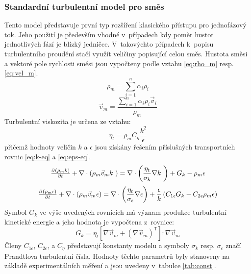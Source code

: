 \subsubsection{Standardní \kepsb{} turbulentní model pro směs}
Tento model představuje první typ rozšíření klasického \keps{} přístupu pro jednofázový tok. Jeho použití je především vhodné v~případech kdy poměr hustot jednotlivých fází je blízký jedničce. V~takovýchto případech k~popisu turbulentního proudění stačí využít veličiny popisující celou směs. Hustota směsi a vektoré pole rychlosti směsi jsou vypočteny podle vztahu \ref{eq:rho_m} resp. \ref{eq:vel_m}.
\begin{equation}
	\rho_{m} = \sum_{i=1}^n \alpha_{i}\rho_{i}
	\label{eq:rho_m}
\end{equation}  
\begin{equation}
	\vec{v}_{m} = \frac{\sum_{i=1}^n \alpha_{i}\rho_{i}\vec{v}_{i}}{\rho_{m} }
	\label{eq:vel_m}
\end{equation}  
Turbulentní viskozita je určena ze vztahu:
\begin{equation}
	\eta_{t} = \rho_{m}C_{\eta}\frac{k^{2}}{\epsilon}
	\label{eq:turb}
\end{equation}  
přičemž hodnoty veličin $k$ a $\epsilon$ jsou získány řešením příslušných transportních rovnic \ref{eq:k-eq} a \ref{eq:eps-eq}.
\begin{equation}
	\pd{\kula{\rho_{m}k}}{t} +  \nabla  \cdot \left( \rho_{m} \vec{v}_{m} k~\right) = \nabla  \cdot \left( \frac{\eta_{t}}{\sigma_{k}} \nabla k~\right) + G_{k} - \rho_{m}\epsilon
	\label{eq:k-eq}
\end{equation}  
\begin{equation}
	\pd{\kula{\rho_{m}\epsilon}}{t} +  \nabla  \cdot \left( \rho_{m} \vec{v}_{m} \epsilon \right) = \nabla  \cdot \left( \frac{\eta_{t}}{\sigma_{\epsilon}} \nabla \epsilon \right) + \frac{\epsilon}{k} \left( C_{1\epsilon}G_{k} - C_{2\epsilon}\rho_{m}\epsilon \right)
	\label{eq:eps-eq}
\end{equation}  
Symbol $G_{k}$ ve výše uvedených rovnicích má význam produkce turbulentní kinetické energie a jeho hodnota je vypočtena z~rovnice:
\begin{equation}
   G_{k} = \eta_{t} \left[ \nabla \vec{v}_{m} +  \left( \nabla \vec{v}_{m} \right)^{\mathsf{T}}\right] : \nabla \vec{v}_{m} 
  \label{eq:gk}
\end{equation} 
Členy $C_{1\epsilon}$, $C_{2\epsilon}$, a $C_{\eta}$ představují konstanty modelu a symboly $\sigma_{k}$ resp. $\sigma_{\epsilon}$ značí Prandtlova turbulentní čísla. Hodnoty těchto parametrů byly stanoveny na základě experimentálních měření a jsou uvedeny v~tabulce \ref{tab:const}.

